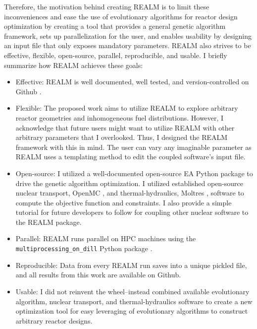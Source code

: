 Therefore, the motivation behind creating REALM is to limit these inconveniences and 
ease the use of evolutionary algorithms for reactor design optimization
by creating a tool that provides a general genetic algorithm framework, sets up 
parallelization for the user, and enables usability by designing an input file 
that only exposes mandatory parameters.
REALM also strives to be effective, flexible, open-source, parallel, reproducible, 
and usable. 
I briefly summarize how \gls{REALM} achieves these goals:  
\begin{itemize}
    \item Effective: \gls{REALM} is well documented, well tested, and 
    version-controlled on Github \cite{chee_arfcrealm_2021}.
    \item Flexible: The proposed work aims to utilize \gls{REALM} to 
    explore arbitrary reactor geometries and inhomogeneous fuel distributions. 
    However, I acknowledge that future users might want to utilize \gls{REALM} 
    with other arbitrary parameters that I overlooked. Thus, I designed the \gls{REALM}
    framework with this in mind. The user can vary any imaginable parameter 
    as \gls{REALM} uses a templating method to edit the coupled software's input 
    file.
    \item Open-source: I utilized a well-documented open-source \gls{EA} Python 
    package to drive the genetic algorithm optimization. I utilized established 
    open-source nuclear transport, OpenMC \cite{romano_openmc_2013}, and 
    thermal-hydraulics, Moltres \cite{lindsay_introduction_2018}, software to 
    compute the objective function and constraints. I also provide a simple 
    tutorial for future developers to follow for coupling other nuclear software 
    to the \gls{REALM} package.  
    \item Parallel: \gls{REALM} runs parallel on \gls{HPC} machines using the 
    \texttt{multiprocessing\_on\_dill} Python package 
    \cite{smallshire_multiprocessing_on_dill_nodate}.
    \item Reproducible: Data from every REALM run saves into a unique pickled 
    file, and all results from this work are available on Github. 
    \item Usable: I did not reinvent the wheel--instead combined available 
    evolutionary algorithm, nuclear transport, and thermal-hydraulics software 
    to create a new optimization tool for easy leveraging of evolutionary algorithms 
    to construct arbitrary reactor designs. 
\end{itemize}


